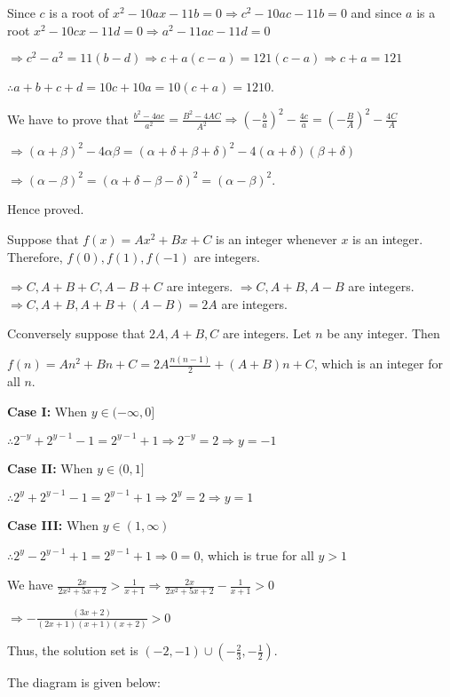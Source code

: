   Since $c$ is a root of $x^2 - 10ax - 11b = 0\Rightarrow c^2 - 10ac - 11b = 0$ and since $a$ is a root
  $x^2 - 10cx - 11d = 0 \Rightarrow a^2 - 11ac - 11d = 0$

  $\Rightarrow c^2 - a^2 = 11(b - d)\Rightarrow c + a(c - a) = 121(c - a)\Rightarrow c + a = 121$

  $\therefore a + b + c + d = 10c + 10a = 10(c + a) = 1210$.
\item We have to prove that $\frac{b^2 - 4ac}{a^2} = \frac{B^2 -
  4AC}{A^2} \Rightarrow \left(-\frac{b}{a}\right)^2 - \frac{4c}{a} = \left(-\frac{B}{A}\right)^2
  - \frac{4C}{A}$

  $\Rightarrow (\alpha + \beta)^2 - 4\alpha\beta = (\alpha + \delta + \beta + \delta)^2 - 4(\alpha
  + \delta)(\beta + \delta)$

  $\Rightarrow (\alpha - \beta)^2 = (\alpha + \delta - \beta - \delta)^2 = (\alpha - \beta)^2$.

  Hence proved.
\item Suppose that $f(x) = Ax^2 + Bx + C$ is an integer whenever $x$ is an integer. Therefore, $f(0), f(1),
  f(-1)$ are integers.

  $\Rightarrow C, A + B + C, A - B + C$ are integers. $\Rightarrow C, A + B, A - B$ are
  integers. $\Rightarrow C, A + B, A+ B + (A - B) = 2A$ are integers.

  Cconversely suppose that $2A, A + B, C$ are integers. Let $n$ be any integer. Then

  $f(n) = An^2 + Bn + C = 2A\frac{n(n - 1)}{2} + (A + B)n + C$, which is an integer for all $n$.
\item {\bf Case I:} When $y\in(-\infty, 0]$

  $\therefore 2^{-y} + 2^{y - 1} - 1 = 2^{y - 1} + 1\Rightarrow 2^{-y} = 2 \Rightarrow y = -1$

  {\bf Case II:} When $y\in(0, 1]$

  $\therefore 2^y + 2^{y - 1} - 1 = 2^{y - 1} + 1\Rightarrow 2^y = 2 \Rightarrow y = 1$

  {\bf Case III:} When $y\in(1, \infty)$

  $\therefore 2^y - 2^{y - 1} + 1 = 2^{y - 1} + 1\Rightarrow 0 = 0$, which is true for all $y > 1$
\item We have $\frac{2x}{2x^2 + 5x + 2} > \frac{1}{x + 1} \Rightarrow \frac{2x}{2x^2 + 5x + 2} - \frac{1}{x
  + 1} > 0$

  $\Rightarrow -\frac{(3x + 2)}{(2x + 1)(x + 1)(x + 2)} > 0$

  Thus, the solution set is $(-2, -1)\cup\left(-\frac{2}{3}, -\frac{1}{2}\right)$.
\item The diagram is given below:

